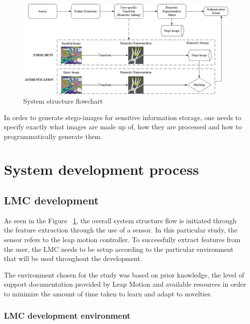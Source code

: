    \begin{figure}[htbp!] 
    \centering    
    \includegraphics[width=1.0\textwidth]{Chapter3/Figs/System_Structure_Flowchart.jpg}
    \caption[System structure flowchart]{System structure flowchart}
    \label{fig:System structure flowchart}
    \end{figure}
    
In order to generate stego-images for sensitive information storage, one needs to specify exactly what images are made up of, how they are processed and how to programmatically generate them.

\section{System development process}


\subsection{LMC development}

As seen in the Figure ~\ref{fig:System structure flowchart}, the overall system structure flow is initiated through the feature extraction through the use of a sensor. In this particular study, the sensor refers to the leap motion controller. To successfully extract features from the user, the LMC needs to be setup according to the particular environment that will be used throughout the development. 

The environment chosen for the study was based on prior knowledge, the level of support documentation provided by Leap Motion and available resources in order to minimize the amount of time taken to learn and adapt to novelties. 

\subsubsection{LMC development environment}

